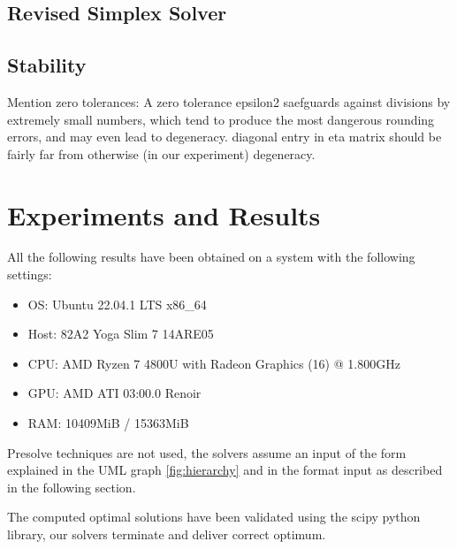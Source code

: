 \subsection{Revised Simplex Solver}


\subsection{Stability}
Mention zero tolerances: A zero tolerance epsilon2 saefguards against divisions
by extremely small numbers, which tend to produce the most dangerous rounding errors, and
may even lead to degeneracy. diagonal entry in eta matrix should be fairly far from
otherwise (in our experiment) degeneracy.


\section{Experiments and Results}
All the following results have been obtained on a system with the following settings:
\begin{itemize}
    \item OS: Ubuntu 22.04.1 LTS x86\_64
    \item Host: 82A2 Yoga Slim 7 14ARE05
    \item CPU: AMD Ryzen 7 4800U with Radeon Graphics (16) @ 1.800GHz
    \item GPU: AMD ATI 03:00.0 Renoir
    \item RAM: 10409MiB / 15363MiB
\end{itemize}

Presolve techniques are not used, the solvers assume an input of the form explained
in the UML graph \ref{fig:hierarchy} and in the format input as described
in the following section.

The computed optimal solutions have been validated using the scipy python library,
our solvers terminate and deliver correct optimum.

